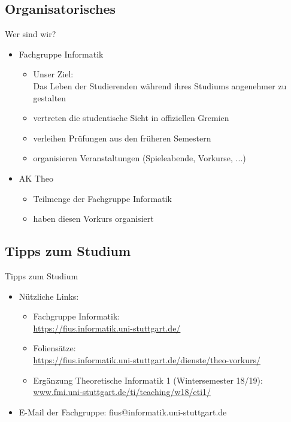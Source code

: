 \subsection{Organisatorisches}
\begin{frame}[fragile]{Wer sind wir?}
    \begin{itemize}
        \item 
            Fachgruppe Informatik
            \begin{itemize}
                \item Unser Ziel: \\
                Das Leben der Studierenden während ihres Studiums angenehmer zu gestalten
                \item vertreten die studentische Sicht in offiziellen Gremien
                \item verleihen Prüfungen aus den früheren Semestern
                \item organisieren Veranstaltungen (Spieleabende, Vorkurse, ...)
            \end{itemize}
        \item AK Theo
        \begin{itemize}
            \item Teilmenge der Fachgruppe Informatik
            \item haben diesen Vorkurs organisiert
        \end{itemize}
    \end{itemize}
\end{frame}

\subsection{Tipps zum Studium}
\begin{frame}[fragile]{Tipps zum Studium}
    \begin{itemize}
        \item Nützliche Links:\\
            \begin{itemize}
                \item Fachgruppe Informatik:\\
                \url{https://fius.informatik.uni-stuttgart.de/}
                \item Foliensätze:\\ \url{https://fius.informatik.uni-stuttgart.de/dienste/theo-vorkurs/}
                 \item Ergänzung Theoretische Informatik 1 (Wintersemester 18/19): \\
                 \url{www.fmi.uni-stuttgart.de/ti/teaching/w18/eti1/}
            \end{itemize}
        \item E-Mail der Fachgruppe: fius@informatik.uni-stuttgart.de
            
    \end{itemize}
\end{frame}
